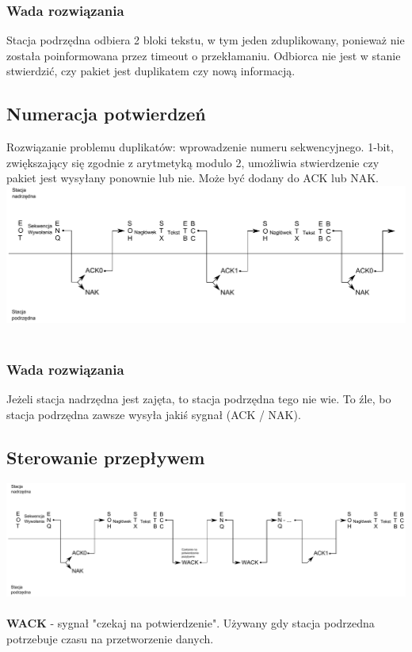 			\subsubsection{Wada rozwiązania}
				Stacja podrzędna odbiera 2 bloki tekstu, w tym jeden zduplikowany, ponieważ nie została poinformowana przez timeout o przekłamaniu. Odbiorca nie jest w stanie stwierdzić, czy pakiet jest duplikatem czy nową informacją.
		\subsection{Numeracja potwierdzeń}
			Rozwiązanie problemu duplikatów: wprowadzenie numeru sekwencyjnego. 1-bit, zwiększający się zgodnie z arytmetyką modulo 2, umożliwia stwierdzenie czy pakiet jest wysyłany ponownie lub nie. Może być dodany do ACK lub NAK.\\
			\includegraphics[width=14cm]{./images/image09.pdf}\\\\
			\subsubsection{Wada rozwiązania}
				Jeżeli stacja nadrzędna jest zajęta, to stacja podrzędna tego nie wie. To źle, bo stacja podrzędna zawsze wysyła jakiś sygnał (ACK / NAK).
		\subsection{Sterowanie przepływem}
			\includegraphics[width=14cm]{./images/image10.pdf}\\\\
			\textbf{WACK} - sygnał "czekaj na potwierdzenie". Używany gdy stacja podrzedna potrzebuje czasu na przetworzenie danych.

